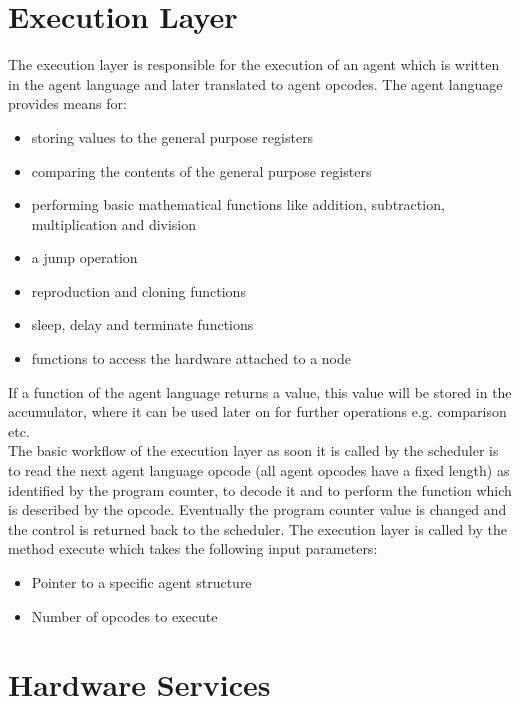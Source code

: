 \documentclass{scrreprt}
\begin{document}
\section{Execution Layer}

The execution layer is responsible for the execution of an agent which is written in the agent language and later translated to agent opcodes. 
The agent language provides means for:
\begin{itemize}
 \item storing values to the general purpose registers
 \item comparing the contents of the general purpose registers 
 \item performing basic mathematical functions like addition, subtraction, multiplication and division
 \item a jump operation 
 \item reproduction and cloning functions
 \item sleep, delay and terminate functions
 \item functions to access the hardware attached to a node
\end{itemize}


If a function of the agent language returns a value, this value will be stored in the accumulator, 
where it can be used later on for further operations e.g. comparison etc. \newline
\\
\noindent
The basic workflow of the execution layer as soon it is called by the scheduler is to read the next 
agent language opcode (all agent opcodes have a fixed length) as identified by the program counter, 
to decode it and to perform the function which is described by the opcode. Eventually the program 
counter value is changed and the control is returned back to the scheduler. The execution layer is 
called by the method execute which takes the following input parameters:
\begin{itemize}
 \item Pointer to a specific agent structure
 \item Number of opcodes to execute
\end{itemize}



\section{Hardware Services}
\end{document}
